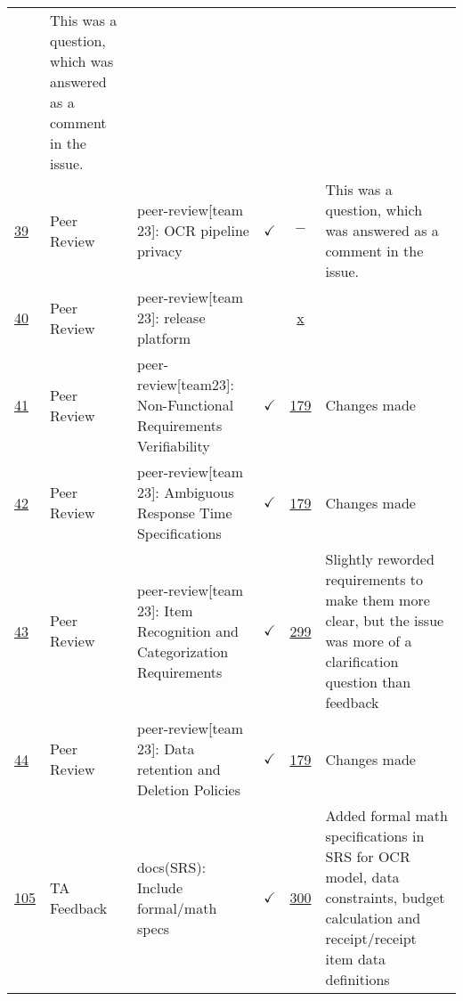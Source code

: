 \documentclass{article}
\begin{document}
\begin{table}[H]
{\begin{tabular}{p{1.5cm} p{2cm} p{3.5cm} c c p{4cm}}
        & This was a question, which was answered as a comment in the issue.  \\ 
        \href{https://github.com/PlutosCapstone/Plutos/issues/39}{39} & Peer
        Review & peer-review[team 23]: OCR pipeline privacy & $\checkmark$ & $-$ &
        This was a question, which was answered as a comment in the issue.  \\ 
        \href{https://github.com/PlutosCapstone/Plutos/issues/40}{40} & Peer
        Review & peer-review[team 23]: release platform &
        & \href{https://github.com/PlutosCapstone/Plutos/pull/x}{x} &   \\ 
        \href{https://github.com/PlutosCapstone/Plutos/issues/41}{41} & Peer
        Review & peer-review[team23]: Non-Functional Requirements Verifiability
        & $\checkmark$ & \href{https://github.com/PlutosCapstone/Plutos/pull/179}{179} &
        Changes made  \\ 
        \href{https://github.com/PlutosCapstone/Plutos/issues/42}{42} & Peer
        Review & peer-review[team 23]: Ambiguous Response Time Specifications  &
        $\checkmark$ &
        \href{https://github.com/PlutosCapstone/Plutos/pull/179}{179} & Changes
        made  \\ 
        \href{https://github.com/PlutosCapstone/Plutos/issues/43}{43} & Peer
        Review & peer-review[team 23]: Item Recognition and Categorization
        Requirements  & $\checkmark$ &
        \href{https://github.com/PlutosCapstone/Plutos/pull/299}{299} & Slightly
        reworded requirements to make them more clear, but the issue was more of
        a clarification question than feedback \\ 
        \href{https://github.com/PlutosCapstone/Plutos/issues/44}{44} & Peer
        Review & peer-review[team 23]: Data retention and Deletion Policies  & $\checkmark$ &
        \href{https://github.com/PlutosCapstone/Plutos/pull/179}{179} & Changes
        made \\ 
        \href{https://github.com/PlutosCapstone/Plutos/issues/105}{105} & TA
        Feedback & docs(SRS): Include formal/math specs & $\checkmark$ & \href{https://github.com/PlutosCapstone/Plutos/pull/300}{300}
        &  Added formal math specifications in SRS for OCR model, data constraints, budget calculation and receipt/receipt item data definitions \\
    \bottomrule
    \end{tabular}%
    }
\end{table}
\end{document}
